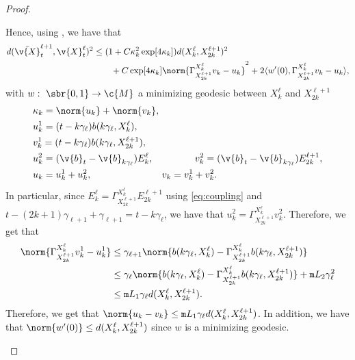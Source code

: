 \begin{proof}{}{}
\begin{enumerate}[wide, labelindent=0pt, label=(\alph*)]
		      Hence, using , we have that \begin{align} \label{eq:upper_bound_distance_cheng_duo} d(\bar{\v{X}}_{t}^{\ell+1}, \v{X}_{t}^\ell)^2 &\leq (1 +C \kappa_k^2 \exp[4 \kappa_k]) d(X_k^\ell,X_{2k}^{\ell+1})^2 \\ & \qquad + C \exp[4 \kappa_k] \norm{\Gamma_{X_{2k}^{\ell+1}}^{X_k^\ell} v_k - u_k}^2 + 2 \langle w'(0), \Gamma_{X_{2k}^{\ell+1}}^{X_k^\ell} v_k - u_k \rangle , \end{align} with \(w: \ \sbr{0,1} \to \c{M}\) a minimizing geodesic between \(X_k^\ell\) and \(X_{2k}^{\ell+1}\) \begin{align}  & \kappa_k = \norm{u_k} + \norm{v_k} , \\ &u_k^1 = (t- k\gamma_\ell) b(k \gamma_\ell, X_k^\ell) , \\ &v_k^1 = (t - k\gamma_{\ell}) b(k \gamma_{\ell }, X_{2k}^{\ell+1}) , \\ &u_k^2 = (\v{b}_{t} - \v{b}_{k \gamma_\ell}) E_{k}^{\ell} , \qquad \quad \quad \ v_k^2 = (\v{b}_{t} - \v{b}_{k \gamma_\ell}) E_{2k}^{\ell+1} , \\ &u_k = u_k^1 + u_k^2 , \qquad \qquad \qquad \quad \ v_k = v_k^1 + v_k^2 .
		      \end{align}
		      In particular, since \(E_k^\ell = \Gamma_{X_{2k}^{\ell+1}}^{X_{k}^\ell} E_{2k}^{\ell+1}\) using \eqref{eq:coupling} and \(t- (2k+1)\gamma_{\ell+1} + \gamma_{\ell+1} = t - k \gamma_\ell\), we have that \(u_k^2 = \Gamma_{X_{2k}^{\ell+1}}^{X_{k}^\ell} v_k^2\).
		      Therefore, we get that \begin{align} \norm{\Gamma_{X_{2k}^{\ell+1}}^{X_{k}^\ell} v_k^1 - u_k^1} & \leq \gamma_{\ell+1} \norm{b(k \gamma_\ell, X_k^\ell) - \Gamma_{X_{2k}^{\ell+1}}^{X_{k}^\ell} b(k \gamma_\ell, X_{2k}^{\ell+1})} \\ &\leq \gamma_{\ell} \norm{b(k \gamma_\ell, X_k^\ell) - \Gamma_{X_{2k}^{\ell+1}}^{X_{k}^\ell} b(k \gamma_\ell, X_{2k}^{\ell+1})} + \mathtt{m}{L}_2 \gamma_{\ell}^2 \\ &\leq \mathtt{m}{L}_1 \gamma_\ell d(X_k^\ell, X_{2k}^{\ell+1}) .
		      \end{align}
		      Therefore, we get that \(\norm{u_k - v_k} \leq \mathtt{m}{L}_1 \gamma_\ell d(X_k^\ell, X_{2k}^{\ell+1})\).
		      In addition, we have that \(\norm{w'(0)} \leq d(X_k^\ell, X_{2k}^{\ell+1})\) since \(w\) is a minimizing geodesic.

\end{enumerate}
\end{proof}
